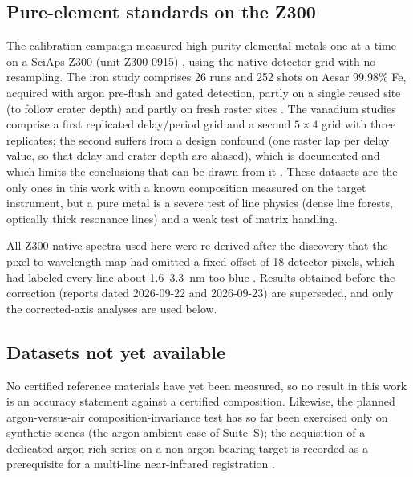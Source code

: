 \subsection{Pure-element standards on the Z300}

The calibration campaign measured high-purity elemental metals one at a time on a SciAps Z300 (unit Z300-0915) %
, using the native detector grid with no resampling. The iron study comprises 26 runs and 252 shots on Aesar 99.98\% Fe, acquired with argon pre-flush and gated detection, partly on a single reused site (to follow crater depth) and partly on fresh raster sites %
. The vanadium studies comprise a first replicated delay/period grid and a second $5\times4$ grid with three replicates; the second suffers from a design confound (one raster lap per delay value, so that delay and crater depth are aliased), which is documented and which limits the conclusions that can be drawn from it %
. These datasets are the only ones in this work with a known composition measured on the target instrument, but a pure metal is a severe test of line physics (dense line forests, optically thick resonance lines) and a weak test of matrix handling.

All Z300 native spectra used here were re-derived after the discovery that the pixel-to-wavelength map had omitted a fixed offset of 18 detector pixels, which had labeled every line about 1.6--\SI{3.3}{\nano\metre} too blue %
. Results obtained before the correction (reports dated 2026-09-22 and 2026-09-23) are superseded, and only the corrected-axis analyses are used below.

\subsection{Datasets not yet available}

No certified reference materials have yet been measured, so no result in this work is an accuracy statement against a certified composition. Likewise, the planned argon-versus-air composition-invariance test has so far been exercised only on synthetic scenes (the argon-ambient case of Suite~S); the acquisition of a dedicated argon-rich series on a non-argon-bearing target is recorded as a prerequisite for a multi-line near-infrared registration %
.

